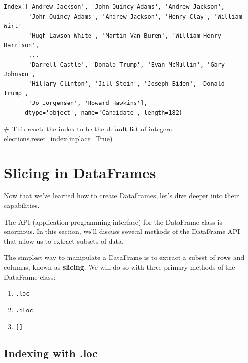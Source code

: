 \documentclass[
  letterpaper,
  DIV=11,
  numbers=noendperiod]{scrreprt}
\newenvironment{Shaded}{\begin{snugshade}}{\end{snugshade}}
\newcommand{\CommentTok}[1]{\textcolor[rgb]{0.37,0.37,0.37}{#1}}
\newcommand{\NormalTok}[1]{\textcolor[rgb]{0.00,0.23,0.31}{#1}}
\newcommand{\OperatorTok}[1]{\textcolor[rgb]{0.37,0.37,0.37}{#1}}
\newcommand{\VariableTok}[1]{\textcolor[rgb]{0.07,0.07,0.07}{#1}}
\providecommand{\tightlist}{%
  \setlength{\itemsep}{0pt}\setlength{\parskip}{0pt}}\usepackage{longtable,booktabs,array}
\begin{document}
\begin{verbatim}
Index(['Andrew Jackson', 'John Quincy Adams', 'Andrew Jackson',
       'John Quincy Adams', 'Andrew Jackson', 'Henry Clay', 'William Wirt',
       'Hugh Lawson White', 'Martin Van Buren', 'William Henry Harrison',
       ...
       'Darrell Castle', 'Donald Trump', 'Evan McMullin', 'Gary Johnson',
       'Hillary Clinton', 'Jill Stein', 'Joseph Biden', 'Donald Trump',
       'Jo Jorgensen', 'Howard Hawkins'],
      dtype='object', name='Candidate', length=182)
\end{verbatim}

\begin{Shaded}
\begin{Highlighting}[]
\CommentTok{\# This resets the index to be the default list of integers}
\NormalTok{elections.reset\_index(inplace}\OperatorTok{=}\VariableTok{True}\NormalTok{) }
\end{Highlighting}
\end{Shaded}

\hypertarget{slicing-in-dataframes}{%
\section{Slicing in DataFrames}\label{slicing-in-dataframes}}

Now that we've learned how to create DataFrames, let's dive deeper into
their capabilities.

The API (application programming interface) for the DataFrame class is
enormous. In this section, we'll discuss several methods of the
DataFrame API that allow us to extract subsets of data.

The simplest way to manipulate a DataFrame is to extract a subset of
rows and columns, known as \textbf{slicing}. We will do so with three
primary methods of the DataFrame class:

\begin{enumerate}
\def\labelenumi{\arabic{enumi}.}
\tightlist
\item
  \texttt{.loc}
\item
  \texttt{.iloc}
\item
  \texttt{{[}{]}}
\end{enumerate}

\hypertarget{indexing-with-.loc}{%
\subsection{Indexing with .loc}\label{indexing-with-.loc}}
\end{document}
